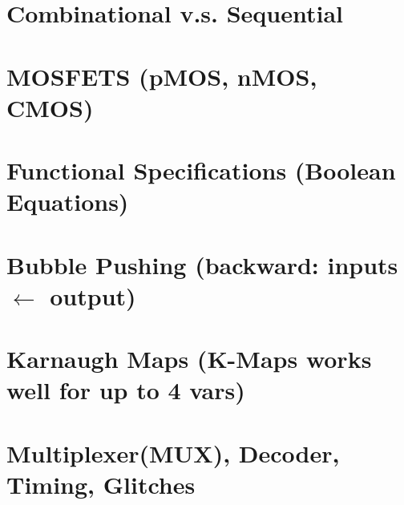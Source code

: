 \documentclass[8pt,a4paper,landscape]{extarticle}
\begin{document}
\pagestyle{empty}
\setlength{\abovedisplayskip}{1pt}
\setlength{\belowdisplayskip}{1pt}
\setlength{\abovedisplayshortskip}{0pt}
\setlength{\belowdisplayshortskip}{0pt}

\begin{multicols*}{3}

% 


\section*{Combinational v.s. Sequential}


\section*{MOSFETS (pMOS, nMOS, CMOS)}


\section*{Functional Specifications (Boolean Equations)}


\section*{Bubble Pushing (backward: inputs $\leftarrow$ output)}


\section*{Karnaugh Maps (K-Maps works well for up to 4 vars)}


\section*{Multiplexer(MUX), Decoder, Timing, Glitches}


\vspace{1cm}


\end{multicols*}
\end{document}
